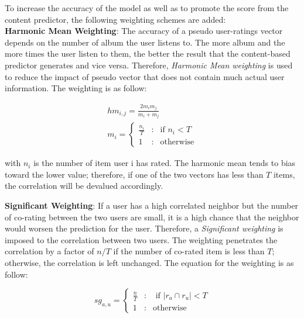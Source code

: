 \noindent To increase the accuracy of the model as well as to promote the score from the content predictor,
the following weighting schemes are added:\\

\noindent \textbf{Harmonic Mean Weighting}: The accuracy of a pseudo user-ratings vector depends on the number of album the user listens to. The more album and the more times the user listen to them, the better the result that the content-based predictor generates and vice versa. Therefore, \textit{Harmonic Mean weighting} is used to reduce the impact of pseudo vector that does not contain much actual user information. The weighting is as follow:

\begin{gather*}
hm_{i,j} = \frac{2m_im_j}{m_i + m_j} \\
m_i = \left\{ \begin{array}{lcl} 
\frac{n_i}{T} & \mbox{:} & \text{if } n_i < T \\
1 & \mbox{:} & \text{otherwise} 
\end{array}
\right. 
\end{gather*} 

with \( n_i \) is the number of item user i has rated. The harmonic mean tends to bias toward the lower value; therefore, if one of the two vectors has less than \(T\) items, the correlation will be devalued accordingly. 


\noindent \textbf{Significant Weighting}: If a user has a high correlated neighbor but the number of co-rating between the two users are small, it is a high chance that the neighbor would worsen the prediction for the user. Therefore, a \textit{Significant weighting} is imposed to the correlation between two users. The weighting penetrates the correlation by a factor of \( n/T\) if the number of co-rated item is less than \(T\); otherwise, the correlation is left unchanged. The equation for the weighting is as follow:

\begin{displaymath}
sg_{a,u} = \left\{ \begin{array}{lcl} 
\frac{n}{T} & \mbox{:} & \text{ if } \left\vert{r_a \cap r_u}\right\vert < T \\
1 & \mbox{:} & \text{otherwise}

\end{array} \right. 
\end{displaymath} 

